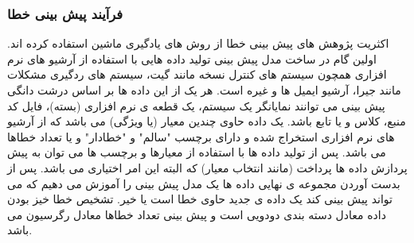 \subsubsection{فرآیند پیش بینی خطا}
اکثریت پژوهش های پیش بینی خطا از روش های یادگیری ماشین  استفاده کرده اند. اولین گام در ساخت مدل پیش بینی تولید داده هایی با استفاده از آرشیو های نرم افزاری همچون سیستم های کنترل نسخه مانند گیت، سیستم های ردگیری مشکلات  مانند جیرا،  آرشیو ایمیل ها و غیره است. هر یک از این داده ها بر اساس درشت دانگی پیش بینی می توانند نمایانگر یک سیستم، یک قطعه ی نرم افزاری (بسته)، فایل کد منبع، کلاس و یا تابع باشد. یک داده حاوی چندین معیار (یا ویژگی) می باشد که از آرشیو های نرم افزاری استخراج شده و دارای برچسب "سالم" و "خطادار"  و یا تعداد خطاها می باشد. پس از تولید داده ها با استفاده از معیارها و برچسب ها می توان به پیش پردازش داده ها پرداخت (مانند انتخاب معیار) که البته این امر اختیاری می باشد. پس از بدست آوردن مجموعه ی نهایی داده ها یک مدل پیش بینی را آموزش می دهیم که می تواند پیش بینی کند یک داده ی جدید حاوی خطا است یا خیر. تشخیص خطا خیز بودن داده معادل دسته بندی دودویی است و پیش بینی تعداد خطاها معادل رگرسیون می باشد. 
